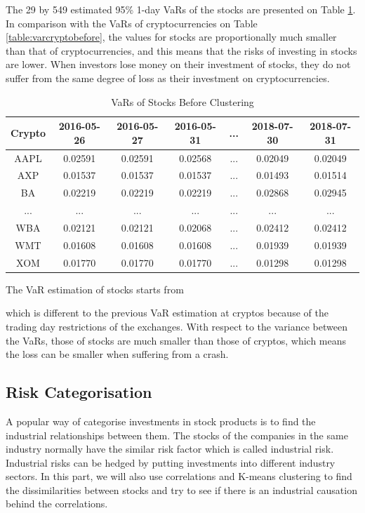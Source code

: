 \documentclass[11pt]{article} %
\theoremstyle{plain}
\theoremstyle{definition}
\begin{document}
The 29 by 549 estimated 95\% 1-day VaRs of the stocks are presented on Table \ref{table:varstockbefore}. In comparison with the VaRs of cryptocurrencies on Table \ref{table:varcryptobefore}, the values for stocks are proportionally much smaller than that of cryptocurrencies, and this means that the risks of investing in stocks are lower. When investors lose money on their investment of stocks, they do not suffer from the same degree of loss as their investment on cryptocurrencies.

{
  \begin{table}[ht]
    \centering
    \small
    \begin{tabular}{|c|c c c c c c|}
        \hline
        Crypto & 2016-05-26 & 2016-05-27 & 2016-05-31 & ... & 2018-07-30 & 2018-07-31 \\ [0.5ex]
        \hline
        AAPL & 0.02591 & 0.02591 & 0.02568 & ... & 0.02049 & 0.02049 \\
        \hline
        AXP & 0.01537 & 0.01537 & 0.01537 & ... & 0.01493 & 0.01514 \\
        \hline
        BA & 0.02219 & 0.02219 & 0.02219 & ... & 0.02868 & 0.02945 \\
        \hline
        ... & ... & ... & ... & ... & ... & ... \\
        \hline
        WBA & 0.02121 & 0.02121 & 0.02068 & ... & 0.02412 & 0.02412 \\
        \hline
        WMT & 0.01608 & 0.01608 & 0.01608 & ... & 0.01939 & 0.01939 \\
        \hline
        XOM & 0.01770 & 0.01770 & 0.01770 & ... & 0.01298 & 0.01298 \\
        \hline
    \end{tabular}
    \caption{VaRs of Stocks Before Clustering}
    \label{table:varstockbefore}
  \end{table}
}

The VaR estimation of stocks starts from \date{26th May 2016} which is different to the previous VaR estimation at cryptos because of the trading day restrictions of the exchanges. With respect to the variance between the VaRs, those of stocks are much smaller than those of cryptos, which means the loss can be smaller when suffering from a crash.

\subsection{Risk Categorisation}

A popular way of categorise investments in stock products is to find the industrial relationships between them. The stocks of the companies in the same industry normally have the similar risk factor which is called industrial risk. Industrial risks can be hedged by putting investments into different industry sectors. In this part, we will also use correlations and K-means clustering to find the dissimilarities between stocks and try to see if there is an industrial causation behind the correlations.
\end{document}

